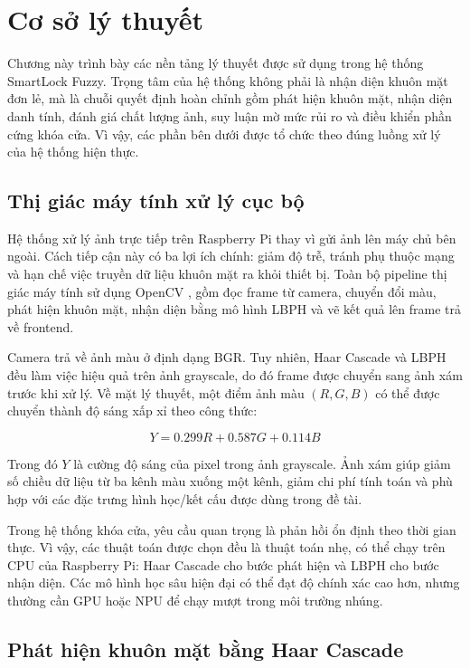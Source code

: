 \section{Cơ sở lý thuyết}

Chương này trình bày các nền tảng lý thuyết được sử dụng trong hệ thống SmartLock Fuzzy. Trọng tâm của hệ thống không phải là nhận diện khuôn mặt đơn lẻ, mà là chuỗi quyết định hoàn chỉnh gồm phát hiện khuôn mặt, nhận diện danh tính, đánh giá chất lượng ảnh, suy luận mờ mức rủi ro và điều khiển phần cứng khóa cửa. Vì vậy, các phần bên dưới được tổ chức theo đúng luồng xử lý của hệ thống hiện thực.

\subsection{Thị giác máy tính xử lý cục bộ}

Hệ thống xử lý ảnh trực tiếp trên Raspberry Pi thay vì gửi ảnh lên máy chủ bên ngoài. Cách tiếp cận này có ba lợi ích chính: giảm độ trễ, tránh phụ thuộc mạng và hạn chế việc truyền dữ liệu khuôn mặt ra khỏi thiết bị. Toàn bộ pipeline thị giác máy tính sử dụng OpenCV \cite{opencv}, gồm đọc frame từ camera, chuyển đổi màu, phát hiện khuôn mặt, nhận diện bằng mô hình LBPH và vẽ kết quả lên frame trả về frontend.

Camera trả về ảnh màu ở định dạng BGR. Tuy nhiên, Haar Cascade và LBPH đều làm việc hiệu quả trên ảnh grayscale, do đó frame được chuyển sang ảnh xám trước khi xử lý. Về mặt lý thuyết, một điểm ảnh màu $(R,G,B)$ có thể được chuyển thành độ sáng xấp xỉ theo công thức:

\begin{equation}
    Y = 0.299R + 0.587G + 0.114B
\end{equation}

Trong đó $Y$ là cường độ sáng của pixel trong ảnh grayscale. Ảnh xám giúp giảm số chiều dữ liệu từ ba kênh màu xuống một kênh, giảm chi phí tính toán và phù hợp với các đặc trưng hình học/kết cấu được dùng trong đề tài.

Trong hệ thống khóa cửa, yêu cầu quan trọng là phản hồi ổn định theo thời gian thực. Vì vậy, các thuật toán được chọn đều là thuật toán nhẹ, có thể chạy trên CPU của Raspberry Pi: Haar Cascade cho bước phát hiện và LBPH cho bước nhận diện. Các mô hình học sâu hiện đại có thể đạt độ chính xác cao hơn, nhưng thường cần GPU hoặc NPU để chạy mượt trong môi trường nhúng.

\subsection{Phát hiện khuôn mặt bằng Haar Cascade}

